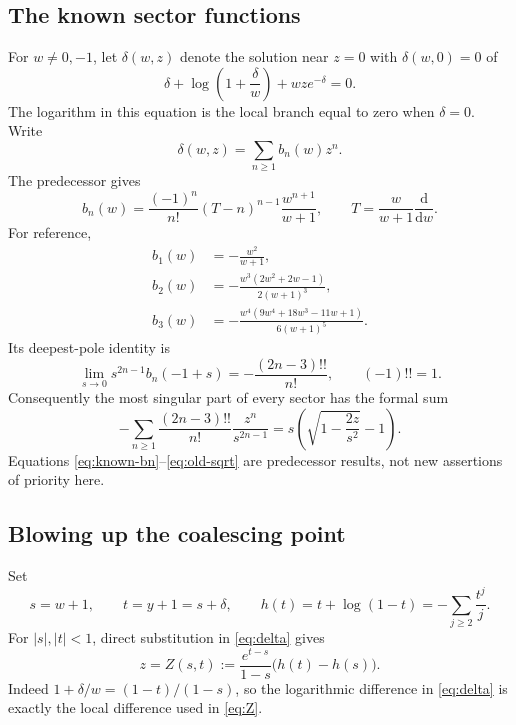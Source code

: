 \documentclass[11pt,a4paper]{article}
\theoremstyle{definition}
\theoremstyle{remark}
\begin{document}
\subsection{The known sector functions}
For $w\ne0,-1$, let $\delta(w,z)$ denote the solution near $z=0$ with
$\delta(w,0)=0$ of
\begin{equation}\label{eq:delta}
 \delta+\log\left(1+\frac{\delta}{w}\right)+wz e^{-\delta}=0.
\end{equation}
The logarithm in this equation is the local branch equal to zero when
$\delta=0$. Write
\begin{equation}\label{eq:sectors}
 \delta(w,z)=\sum_{n\ge1} b_n(w)z^n.
\end{equation}
The predecessor gives
\begin{equation}\label{eq:known-bn}
 b_n(w)=\frac{(-1)^n}{n!}(T-n)^{n-1}\frac{w^{n+1}}{w+1},
 \qquad T=\frac{w}{w+1}\frac{\mathrm d}{\mathrm dw}.
\end{equation}
For reference,
\begin{align}
 b_1(w)&=-\frac{w^2}{w+1},\nonumber\\
 b_2(w)&=-\frac{w^3(2w^2+2w-1)}{2(w+1)^3},\label{eq:first-bn}\\
 b_3(w)&=-\frac{w^4(9w^4+18w^3-11w+1)}{6(w+1)^5}.\nonumber
\end{align}
Its deepest-pole identity is
\begin{equation}\label{eq:old-poles}
 \lim_{s\to0}s^{2n-1}b_n(-1+s)
 =-\frac{(2n-3)!!}{n!},\qquad (-1)!!=1.
\end{equation}
Consequently the most singular part of every sector has the formal sum
\begin{equation}\label{eq:old-sqrt}
 -\sum_{n\ge1}\frac{(2n-3)!!}{n!}\frac{z^n}{s^{2n-1}}
 =s\left(\sqrt{1-\frac{2z}{s^2}}-1\right).
\end{equation}
Equations \eqref{eq:known-bn}--\eqref{eq:old-sqrt} are predecessor results,
not new assertions of priority here.

\subsection{Blowing up the coalescing point}
Set
\begin{equation}\label{eq:coordinates}
 s=w+1,\qquad t=y+1=s+\delta,
 \qquad h(t)=t+\log(1-t)=-\sum_{j\ge2}\frac{t^j}{j}.
\end{equation}
For $|s|,|t|<1$, direct substitution in \eqref{eq:delta} gives
\begin{equation}\label{eq:Z}
 z=Z(s,t):=\frac{e^{t-s}}{1-s}\bigl(h(t)-h(s)\bigr).
\end{equation}
Indeed $1+\delta/w=(1-t)/(1-s)$, so the logarithmic difference in
\eqref{eq:delta} is exactly the local difference used in \eqref{eq:Z}.
\end{document}
